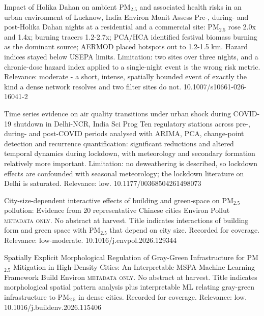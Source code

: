 \documentclass[10pt]{article}
\begin{document}
{Impact of Holika Dahan on ambient PM$_{2.5}$ and associated health risks in an urban environment of Lucknow, India}
{Environ Monit Assess}
{Pre-, during- and post-Holika Dahan nights at a residential and a commercial site: PM$_{2.5}$ rose 2.0x and 1.4x; burning tracers 1.2-2.7x; PCA/HCA identified festival biomass burning as the dominant source; AERMOD placed hotspots out to 1.2-1.5 km. Hazard indices stayed below USEPA limits. Limitation: two sites over three nights, and a chronic-dose hazard index applied to a single-night event is the wrong risk metric. Relevance: moderate - a short, intense, spatially bounded event of exactly the kind a dense network resolves and two filter sites do not.}
{10.1007/s10661-026-16041-2}

{Time series evidence on air quality transitions under urban shock during COVID-19 shutdown in Delhi-NCR, India}
{Sci Prog}
{Ten regulatory stations across pre-, during- and post-COVID periods analysed with ARIMA, PCA, change-point detection and recurrence quantification: significant reductions and altered temporal dynamics during lockdown, with meteorology and secondary formation relatively more important. Limitation: no deweathering is described, so lockdown effects are confounded with seasonal meteorology; the lockdown literature on Delhi is saturated. Relevance: low.}
{10.1177/00368504261498073}

{City-size-dependent interactive effects of building and green-space on PM$_{2.5}$ pollution: Evidence from 20 representative Chinese cities}
{Environ Pollut}
{\textsc{metadata only.} No abstract at harvest. Title indicates interactions of building form and green space with PM$_{2.5}$ that depend on city size. Recorded for coverage. Relevance: low-moderate.}
{10.1016/j.envpol.2026.129344}

{Spatially Explicit Morphological Regulation of Gray-Green Infrastructure for PM$_{2.5}$ Mitigation in High-Density Cities: An Interpretable MSPA-Machine Learning Framework}
{Build Environ}
{\textsc{metadata only.} No abstract at harvest. Title indicates morphological spatial pattern analysis plus interpretable ML relating gray-green infrastructure to PM$_{2.5}$ in dense cities. Recorded for coverage. Relevance: low.}
{10.1016/j.buildenv.2026.115406}

\par{}\baselineskip{}\baselineskip
{}
\end{document}
